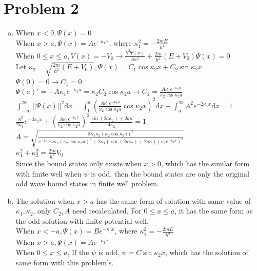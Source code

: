 \documentclass[a4paper]{article}
\begin{document}
\section{Problem 2}
\begin{enumerate}[(a)]
    \item When $x<0,\Psi(x)=0$
    \\When $x>a,\Psi(x)=Ae^{-\kappa_1x}$, where $\kappa_1^2=-\frac{2mE}{\hbar^2}$
    \\When $0\leq x\leq a,V(x)=-V_0\rightarrow\frac{\partial^2\Psi(x)}{\partial x^2}+\frac{2m}{\hbar^2}(E+V_0)\Psi(x)=0$
    \\Let $\kappa_2=\sqrt{\frac{2m}{\hbar^2}(E+V_0)},\Psi(x)=C_1\cos\kappa_2x+C_2\sin\kappa_2x$
    \\$\Psi(0)=0\rightarrow C_1=0$
    \\$\Psi(a)'=-A\kappa_1e^{-\kappa_1a}=\kappa_2C_2\cos\kappa_2a\rightarrow C_2=\frac{A\kappa_1e^{-\kappa_1a}}{\kappa_2\cos\kappa_2a}$
    \\$\int_{-\infty}^\infty||\Psi(x)||^2\mathrm{d}x=\int_0^a(\frac{A\kappa_1e^{-\kappa_1a}}{\kappa_2\cos\kappa_2a}\cos\kappa_2x)^2\mathrm{d}x+\int_a^\infty A^2e^{-2\kappa_1x}\mathrm{d}x=1$
    \\$\frac{A^2}{2\kappa_1}e^{-2\kappa_1x}+(\frac{A\kappa_1e^{-\kappa_1a}}{\kappa_2\cos\kappa_2a})^2\frac{\sin(2a\kappa_2)+2a\kappa}{4\kappa_2}=1$
    \\$A=\sqrt{\frac{8\kappa_1\kappa_2(\kappa_2\cos\kappa_2a)^2}{e^{-2\kappa_1x}4\kappa_2(\kappa_2\cos\kappa_2a)^2+2\kappa_1(\sin(2a\kappa_2)+2a\kappa)(\kappa_1e^{-\kappa_1a})^2}}$
    \\$\kappa_1^2+\kappa_2^2=\frac{2m}{\hbar^2}V_0$
    \\Since the bound states only exists when $x>0$, which has the similar form with finite well when $\psi$ is odd, then the bound states are only the original odd wave bound states in finite well problem.
    \item The solution when $x>a$ has the same form of solution with same value of $\kappa_1,\kappa_2$, only $C_2,A$ need recalculated. For $0\leq x\leq a$, it has the same form as the odd solution with finite potential well.
    \\When $x<-a,\Psi(x)=Be^{-\kappa_1x}$, where $\kappa_1^2=-\frac{2mE}{\hbar^2}$
    \\When $x>a,\Psi(x)=Ae^{-\kappa_1x}$
    \\When $0\leq x\leq a$, If the $\psi$ is odd, $\psi=C\sin\kappa_2x$, which has the solution of same form with this problem's.

\end{enumerate}
\end{document}
